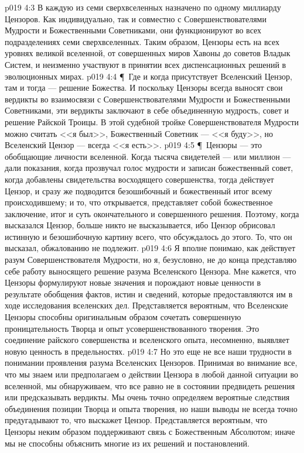 \vs p019 4:3 В каждую из семи сверхвселенных назначено по одному миллиарду Цензоров. Как индивидуально, так и совместно с Совершенствователями Мудрости и Божественными Советниками, они функционируют во всех подразделениях семи сверхвселенных. Таким образом, Цензоры есть на всех уровнях великой вселенной, от совершенных миров Хавоны до советов Владык Систем, и неизменно участвуют в принятии всех диспенсационных решений в эволюционных мирах.
\vs p019 4:4 \P\ Где и когда присутствует Вселенский Цензор, там и тогда --- решение Божества. И поскольку Цензоры всегда выносят свои вердикты во взаимосвязи с Совершенствователями Мудрости и Божественными Советниками, эти вердикты заключают в себе объединенную мудрость, совет и решение Райской Троицы. В этой судебной тройке Совершенствователя Мудрости можно считать <<я был>>, Божественный Советник --- <<я буду>>, но Вселенский Цензор --- всегда <<я есть>>.
\vs p019 4:5 \P\ Цензоры --- это обобщающие личности вселенной. Когда тысяча свидетелей --- или миллион --- дали показания, когда прозвучал голос мудрости и записан божественный совет, когда добавлены свидетельства восходящего совершенства, тогда действует Цензор, и сразу же подводится безошибочный и божественный итог всему происходившему; и то, что открывается, представляет собой божественное заключение, итог и суть окончательного и совершенного решения. Поэтому, когда высказался Цензор, больше никто не высказывается, ибо Цензор обрисовал истинную и безошибочную картину всего, что обсуждалось до этого. То, что он высказал, обжалованию не подлежит.
\vs p019 4:6 Я вполне понимаю, как действует разум Совершенствователя Мудрости, но я, безусловно, не до конца представляю себе работу выносящего решение разума Вселенского Цензора. Мне кажется, что Цензоры формулируют новые значения и порождают новые ценности в результате обобщения фактов, истин и сведений, которые предоставляются им в ходе исследования вселенских дел. Представляется вероятным, что Вселенские Цензоры способны оригинальным образом сочетать совершенную проницательность Творца и опыт усовершенствованного творения. Это соединение райского совершенства и вселенского опыта, несомненно, выявляет новую ценность в предельностях.
\vs p019 4:7 Но это еще не все наши трудности в понимании проявления разума Вселенских Цензоров. Принимая во внимание все, что мы знаем или предполагаем о действии Цензора в любой данной ситуации во вселенной, мы обнаруживаем, что все равно не в состоянии предвидеть решения или предсказывать вердикты. Мы очень точно определяем вероятные следствия объединения позиции Творца и опыта творения, но наши выводы не всегда точно предугадывают то, что выскажет Цензор. Представляется вероятным, что Цензоры неким образом поддерживают связь с Божественным Абсолютом; иначе мы не способны объяснить многие из их решений и постановлений.
